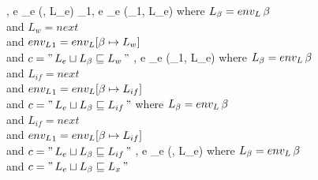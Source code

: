         {\ienvP \vdash {}}
        {}
        {\ienvP \vdash {}}
        {\ienvL, \ienvP \vdash e \rightarrow_e (\icstr, L_e)}
        {}
        {\ienvP \vdash {}}
        {\ienvP \vdash {} \quad
          \ienvP \vdash {}}
        {}
        {\ienvP \vdash {}}
        {\ienvL_1, \ienvP \vdash e \rightarrow_e (\icstr_1, L_e) \quad
          \ienvP \vdash {}}
        {where $L_\beta = {env_L} \, \beta$ \\
          and $L_w = next$ \\
          and ${env_L}_1 = {env_L}[\beta \mapsto L_w]$ \\
          and $c = " \, L_e \sqcup L_\beta \sqsubseteq L_w \, "$}
        {\ienvP \vdash {}}
        {\ienvL, \ienvP \vdash e \rightarrow_e (\icstr_1, L_e) \quad
          \ienvP \vdash {}}
        {where $L_\beta = {env_L} \, \beta$ \\
          and $L_{if} = next$ \\
          and ${env_L}_1 = {env_L}[\beta \mapsto L_{if}]$ \\
          and $c = " \, L_e \sqcup L_\beta \sqsubseteq L_{if} \, "$}
        {\ienvP \vdash {}}
        {
          {\ienvP \vdash {} \quad
          \ienvP \vdash {}}}
          {where $L_\beta = {env_L} \, \beta$ \\
            and $L_{if} = next$ \\
            and ${env_L}_1 = {env_L}[\beta \mapsto L_{if}]$ \\
            and $c = " \, L_e \sqcup L_\beta \sqsubseteq L_{if} \, "$}
        {\ienvP \vdash {}}
        {\ienvL, \ienvP \vdash e \rightarrow_e (\icstr, L_e)}
        {where $L_\beta = {env_L} \, \beta$ \\
          and $c = " \, L_e \sqcup L_\beta \sqsubseteq L_x \, "$ }

